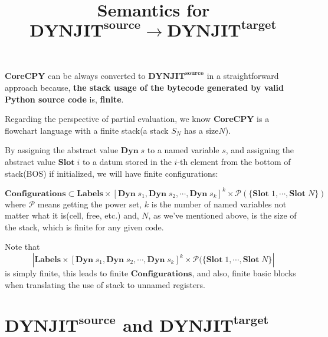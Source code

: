 \documentclass[12pt, a4paper]{report}
\title{Semantics for $\mathbf{DYNJIT}^\mathbf{source} \rightarrow \mathbf{DYNJIT}^\mathbf{target}$}
\begin{document}
\maketitle

\textbf{CoreCPY} can be always converted to $\mathbf{DYNJIT}^\mathbf{source}$
in a straightforward approach because,
\textbf{the stack usage of the bytecode generated by valid Python source code} is, \textbf{finite}.

Regarding the perspective of partial evaluation,
we know \textbf{CoreCPY} is a flowchart language with a finite stack(a stack $S_N$ has a size$N$).

By assigning the abstract value $\mathbf{Dyn}\; s$ to a named variable $s$,
and assigning the abstract value $\mathbf{Slot}\; i$ to a datum stored in the $i$-th element from the bottom of stack(BOS) if initialized,
we will have finite configurations:

$$ \mathbf{Configurations} \subset \mathbf{Labels} \times 
\left[\mathbf{Dyn}\; s_1, \mathbf{Dyn}\; s_2, \cdots, \mathbf{Dyn}\; s_k \right]^k
\times \mathcal {P}(\{\mathbf{Slot}\; 1, \cdots, \mathbf {Slot}\; N \})
$$
where 
$\mathcal {P}$ means getting the power set, $k$ is the number of named variables not matter what it is(cell, free, etc.) and,
$N$, as we've mentioned above, is the size of the stack, which is finite for any given code.

Note that
$$ \left| \mathbf{Labels} \times 
\left[\mathbf{Dyn}\; s_1, \mathbf{Dyn}\; s_2, \cdots, \mathbf{Dyn}\; s_k \right]^k
\times \mathcal {P}(\{\mathbf{Slot}\; 1, \cdots, \mathbf {Slot}\; N \} \right| $$ is simply finite,
this leads to finite $\mathbf{Configurations}$, and also, finite basic blocks
when translating the use of stack to unnamed registers.

\newpage

\section*{
    $\mathbf{DYNJIT}^{\mathbf{source}}$ 
    and 
    $\mathbf{DYNJIT}^{\mathbf{target}}$
}
\end{document}
